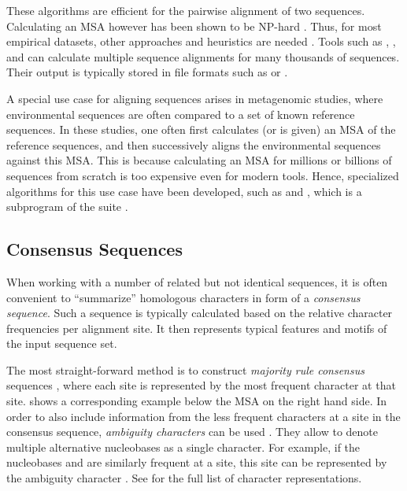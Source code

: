 These algorithms are efficient for the pairwise alignment of two sequences.
Calculating an MSA however has been shown to be NP-hard \cite{Wang1994,Just2001}.
Thus, for most empirical datasets, other approaches and heuristics are needed \cite{Thompson2011}.
Tools such as  \cite{Higgins1988},  \cite{Edgar2004}, and  \cite{Katoh2002}
can calculate multiple sequence alignments for many thousands of sequences.
Their output is typically stored in file formats
such as  \cite{Pearson1988} or  \cite{Felsenstein1981}.

A special use case for aligning sequences arises in metagenomic studies,
where environmental sequences are often compared to a set of known reference sequences.
In these studies, one often first calculates (or is given) an MSA of the reference sequences,
and then successively aligns the environmental sequences against this MSA.
This is because calculating an MSA for millions or billions of sequences from scratch is too expensive even for modern tools.
Hence, specialized algorithms for this use case have been developed,
such as  \cite{Berger2011a,Berger2012} and
, which is a subprogram of the  suite \cite{Eddy1998,Eddy2009}.


\subsection{Consensus Sequences}
\label{ch:Foundations:sec:SequenceAnalysis:sub:ConsensusSequences}

When working with a number of related but not identical sequences,
it is often convenient to ``summarize'' homologous characters in form of a \emph{consensus sequence}.
Such a sequence is typically calculated based on the relative character frequencies per alignment site.
It then represents typical features and motifs of the input sequence set.

The most straight-forward method is to construct \emph{majority rule consensus} sequences \cite{May1952,Day1992a},
where each site is represented by the most frequent character at that site.
 shows a corresponding example below the MSA on the right hand side.
In order to also include information from the less frequent characters at a site in the consensus sequence,
\emph{ambiguity characters} can be used \cite{IUPAC1970}.
They allow to denote multiple alternative nucleobases as a single character.
For example, if the nucleobases  and  are similarly frequent at a site,
this site can be represented by the ambiguity character .
See  for the full list of character representations.


